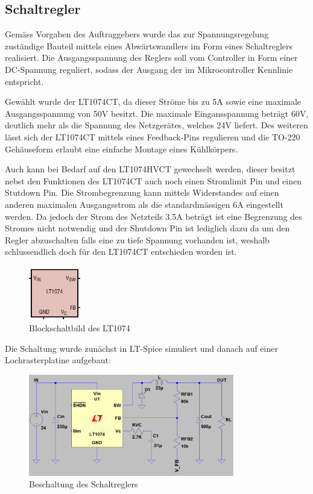 \documentclass[a4paper]{fhnwreport}
\begin{document}
\subsection{Schaltregler}\label{schaltregler}

Gemäss Vorgaben des Auftraggebers wurde das zur Spannungsregelung zuständige Bauteil mittels eines Abwärtswandlers im Form eines Schaltreglers realisiert. Die Ausgangsspannung des Reglers soll vom Controller in Form einer DC-Spannung reguliert, sodass der Ausgang der im Mikrocontroller Kennlinie entspricht. 

Gewählt wurde der LT1074CT, da dieser Ströme bis zu 5A sowie eine maximale Ausgangsspannung von 50V besitzt. Die maximale Eingansspannung beträgt 60V, deutlich mehr als die Spannung des Netzgerätes, welches 24V liefert.
Des weiteren lässt sich der LT1074CT mittels eines Feedback-Pins regulieren und die TO-220 Gehäuseform erlaubt eine einfache Montage eines Kühlkörpers.

Auch kann bei Bedarf auf den LT1074HVCT gewechselt werden, dieser besitzt nebst den Funktionen des LT1074CT auch noch einen Stromlimit Pin und einen Stutdown Pin. Die Strombegrenzung kann mittels Widerstandes auf einen anderen maximalen Ausgangsstrom als die standardmässigen 6A eingestellt werden. Da jedoch der Strom des Netzteils 3.5A beträgt ist eine Begrenzung des Stromes nicht notwendig und  der Shutdown Pin ist lediglich dazu da um den Regler abzuschalten falls eine zu tiefe Spannung vorhanden ist, weshalb schlussendlich doch für den LT1074CT entschieden worden ist.

\begin{figure}[h]
\centering
\includegraphics[width=0.2\textwidth]{LTData}%
\caption{Blockschaltbild des LT1074}
\label{fig::LTData}
\end{figure}

Die Schaltung wurde zunächst in LT-Spice simuliert und danach auf einer Lochrasterplatine aufgebaut:

\begin{figure}[h]
\centering
\includegraphics[width=0.8\textwidth]{LTSchemata}%
\caption{Beschaltung des Schaltreglers}%
\label{fig::LTSchemata}%
\end{figure}
\end{document}
